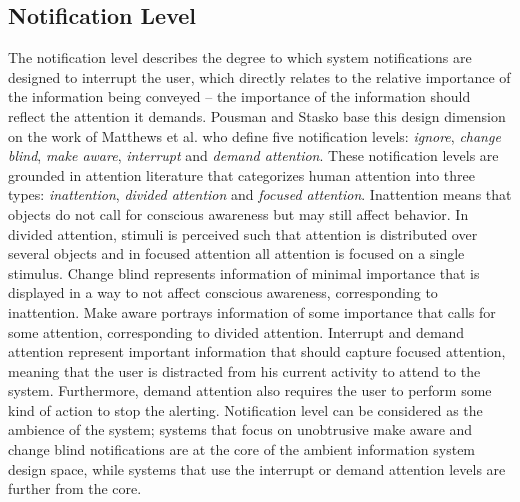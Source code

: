 \subsection{Notification Level}
The notification level describes the degree to which system notifications are designed to interrupt the user, which directly relates to the relative importance of the information being conveyed -- the importance of the information should reflect the attention it demands. Pousman and Stasko base this design dimension on the work of Matthews et al. \cite{matthews2004toolkit} who define five notification levels: \emph{ignore}, \emph{change blind}, \emph{make aware}, \emph{interrupt} and \emph{demand attention}. These notification levels are grounded in attention literature that categorizes human attention into three types: \emph{inattention}, \emph{divided attention} and \emph{focused attention}. Inattention means that objects do not call for conscious awareness but may still affect behavior. In divided attention, stimuli is perceived such that attention is distributed over several objects and in focused attention all attention is focused on a single stimulus. Change blind represents information of minimal importance that is displayed in a way to not affect conscious awareness, corresponding to inattention. Make aware portrays information of some importance that calls for some attention, corresponding to divided attention. Interrupt and demand attention represent important information that should capture focused attention, meaning that the user is distracted from his current activity to attend to the system. Furthermore, demand attention also requires the user to perform some kind of action to stop the alerting. Notification level can be considered as the ambience of the system; systems that focus on unobtrusive make aware and change blind notifications are at the core of the ambient information system design space, while systems that use the interrupt or demand attention levels are further from the core.

